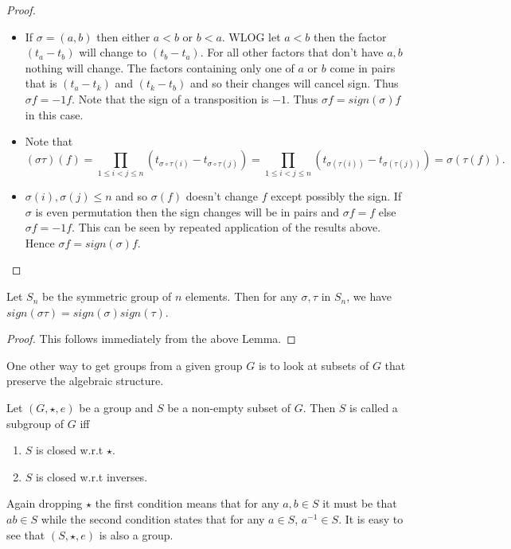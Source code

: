 \begin{proof}
    \begin{itemize}
    \item If $\sigma = (a,b)$ then either $a < b$ or $b < a$. WLOG let $a < b$ then the factor
	$(t_a - t_b)$ will change to $(t_b - t_a)$. For all other factors that don't have $a,b$
	nothing will change. The factors containing only one of $a$ or $b$ come in pairs that is
	$(t_a - t_k)$ and $(t_k - t_b)$ and so their changes will cancel sign. Thus $\sigma f = -1 f$.
	Note that the sign of a transposition is $-1$. Thus $\sigma f = sign(\sigma) f$ in this case.
    \item Note that
	\begin{equation*}
	(\sigma \tau)(f) =  \prod_{1 \leq i < j\leq n}(t_{\sigma \circ \tau{(i)}} - 
	t_{\sigma\circ\tau{(j)}}) = \prod_{1 \leq i < j\leq n}(t_{\sigma(\tau{(i)})} - 
	t_{\sigma(\tau{(j)})}) = \sigma(\tau (f)).
    \end{equation*}
    \item $\sigma(i) , \sigma(j) \leq n$ and so $\sigma(f)$ doesn't change $f$ except possibly the
	sign. If $\sigma$ is even permutation then the sign changes will be in pairs and $\sigma f =
	f$ else $\sigma f = -1 f$. This can be seen by repeated application of the results above. 
	Hence $\sigma f = sign(\sigma) f$.
\end{itemize}
\end{proof}
\begin{Theorem}\label{thm:sign_permutation}
    Let $S_n$ be the symmetric group of $n$ elements. Then for any $\sigma,\tau$ in $S_n$, we have
    $sign(\sigma \tau) = sign(\sigma)sign(\tau)$.
\end{Theorem}
\begin{proof}
    This follows immediately from the above Lemma. 
\end{proof}

One other way to get groups from a given group $G$ is to look at subsets of $G$ that preserve the
algebraic structure.
\begin{Definition}
    Let $\left(G,\star,e\right)$ be a group and $S$ be a non-empty subset of $G$. Then $S$ is called
    a subgroup of $G$ iff
    \begin{enumerate}
	\item $S$ is closed w.r.t $\star$.
	\item $S$ is closed w.r.t inverses.
    \end{enumerate}
\end{Definition}
Again dropping $\star$ the first condition means that for any $a,b \in S$ it must be that $ab \in
S$ while the second condition states that for any $a \in S$, $a^{-1} \in S$. It is easy to see 
that $\left(S,\star,e\right)$ is also a group.

